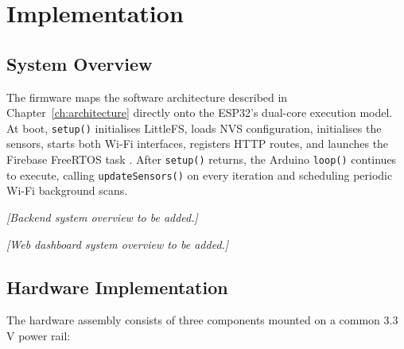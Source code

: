 
\chapter{Implementation}
\label{ch:implementation}

\section{System Overview}

The firmware maps the software architecture described in
Chapter~\ref{ch:architecture} directly onto the ESP32's dual-core execution model.
At boot, \texttt{setup()} initialises LittleFS, loads NVS configuration, initialises the sensors, starts
both Wi-Fi interfaces, registers HTTP routes, and launches the Firebase FreeRTOS task .
After \texttt{setup()} returns, the Arduino \texttt{loop()} continues to execute, calling \texttt{updateSensors()} on every iteration and scheduling periodic
Wi-Fi background scans.

\begin{center}
	\textit{[Backend system overview to be added.]}
\end{center}

\begin{center}
	\textit{[Web dashboard system overview to be added.]}
\end{center}

\section{Hardware Implementation}

The hardware assembly consists of three components mounted on a common 3.3\,V power
rail:

